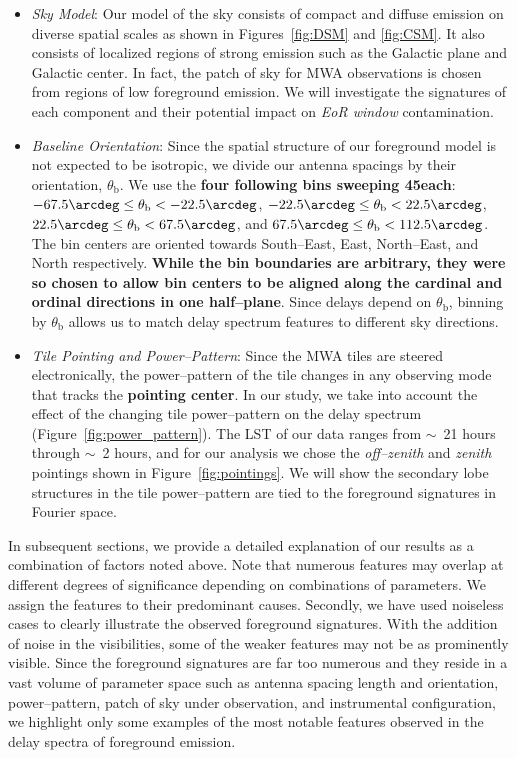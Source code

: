 \documentclass[preprint2,iop,numberedappendix]{emulateapj}
\begin{document}
\begin{itemize}

\item {\it Sky Model}: Our model of the sky consists of compact and diffuse emission on diverse spatial scales as shown in Figures~\ref{fig:DSM} and \ref{fig:CSM}. It also consists of localized regions of strong emission such as the Galactic plane and Galactic center. %
In fact, the patch of sky for MWA observations is chosen from regions of low foreground emission. We will investigate the signatures of each component and their potential impact on {\it EoR window} contamination.

\item {\it Baseline Orientation}: Since the spatial structure of our foreground model is not expected to be isotropic, we divide our antenna spacings by their orientation, $\theta_\textrm{b}$. We use the {\bf four following bins sweeping 45\arcdeg each}: $-67.5\arcdeg\le \theta_\textrm{b} < -22.5\arcdeg$, $-22.5\arcdeg\le \theta_\textrm{b} < 22.5\arcdeg$, $22.5\arcdeg\le \theta_\textrm{b} < 67.5\arcdeg$, and $67.5\arcdeg\le \theta_\textrm{b} < 112.5\arcdeg$. The bin centers are oriented towards South--East, East, North--East, and North respectively. {\bf While the bin boundaries are arbitrary, they were so chosen to allow bin centers to be aligned along the cardinal and ordinal directions in one half--plane}. Since delays depend on $\theta_\textrm{b}$, binning by $\theta_\textrm{b}$ allows us to match delay spectrum features to different sky directions.

\item {\it Tile Pointing and Power--Pattern}: Since the MWA tiles are steered electronically, the power--pattern of the tile changes in any observing mode that tracks the {\bf pointing center}. In our study, we take into account the effect of the changing tile power--pattern on the delay spectrum (Figure~\ref{fig:power_pattern}). The LST of our data ranges from $\sim$~21 hours through $\sim$~2 hours, and for our analysis we chose the {\it off--zenith} and {\it zenith} pointings shown in Figure~\ref{fig:pointings}. We will show the secondary lobe structures in the tile power--pattern are tied to the foreground signatures in Fourier space. 

\end{itemize}

In subsequent sections, we provide a detailed explanation of our results as a combination of factors noted above. Note that numerous features may overlap at different degrees of significance depending on combinations of parameters. We assign the features to their predominant causes. Secondly, we have used noiseless cases to clearly illustrate the observed foreground signatures. With the addition of noise in the visibilities, some of the weaker features may not be as prominently visible. Since the foreground signatures are far too numerous and they reside in a vast volume of parameter space such as antenna spacing length and orientation, power--pattern, patch of sky under observation, and instrumental configuration, we highlight only some examples of the most notable features observed in the delay spectra of foreground emission.
\end{document}
